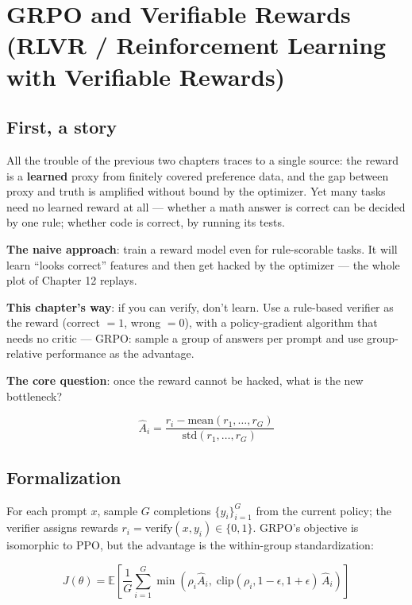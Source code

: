 \documentclass{article}
\begin{document}
\section*{GRPO and Verifiable Rewards (RLVR / Reinforcement Learning with Verifiable Rewards)}

\subsection*{First, a story}

All the trouble of the previous two chapters traces to a single source: the reward is a \textbf{learned} proxy from finitely covered preference data, and the gap between proxy and truth is amplified without bound by the optimizer. Yet many tasks need no learned reward at all --- whether a math answer is correct can be decided by one rule; whether code is correct, by running its tests.

\textbf{The naive approach}: train a reward model even for rule-scorable tasks. It will learn ``looks correct'' features and then get hacked by the optimizer --- the whole plot of Chapter 12 replays.

\textbf{This chapter's way}: if you can verify, don't learn. Use a rule-based verifier as the reward (correct $=1$, wrong $=0$), with a policy-gradient algorithm that needs no critic --- GRPO: sample a group of answers per prompt and use group-relative performance as the advantage.

\textbf{The core question}: once the reward cannot be hacked, what is the new bottleneck?

\[
\boxed{\hat{A}_{i} = \frac{r_{i} - \mathrm{mean}(r_{1},\dots,r_{G})}{\mathrm{std}(r_{1},\dots,r_{G})}}
\]

\subsection*{Formalization}

For each prompt $x$, sample $G$ completions $\{y_{i}\}_{i=1}^{G}$ from the current policy; the verifier assigns rewards $r_{i}=\mathrm{verify}(x, y_{i})\in\{0,1\}$. GRPO's objective is isomorphic to PPO, but the advantage is the within-group standardization:

\[
\boxed{J(\theta) = \mathbb{E}\left[\frac{1}{G}\sum_{i=1}^{G} \min\!\left(\rho_{i}\hat{A}_{i},\; \mathrm{clip}(\rho_{i}, 1\!-\!\epsilon, 1\!+\!\epsilon)\,\hat{A}_{i}\right)\right]}
\]
\end{document}
